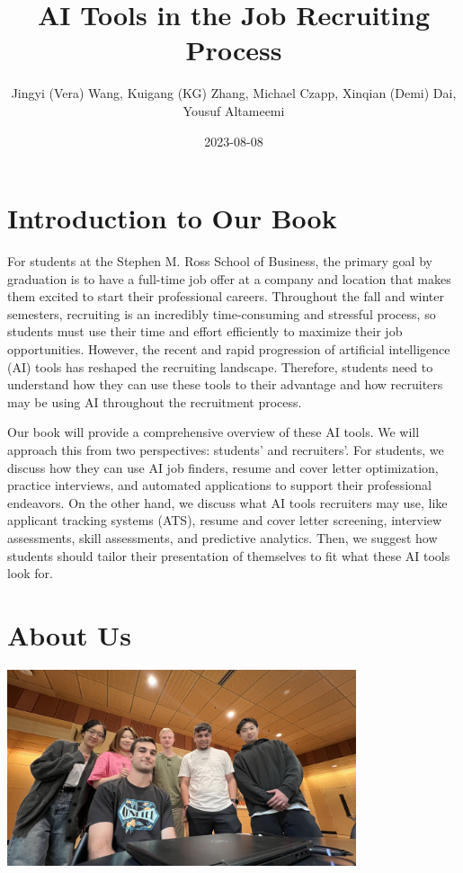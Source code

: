 \documentclass[
]{book}
\title{AI Tools in the Job Recruiting Process}
\author{Jingyi (Vera) Wang, Kuigang (KG) Zhang, Michael Czapp, Xinqian (Demi) Dai, Yousuf Altameemi}
\date{2023-08-08}
\begin{document}
\maketitle

{
\setcounter{tocdepth}{1}
\tableofcontents
}
\hypertarget{introduction-to-our-book}{%
\chapter{Introduction to Our Book}\label{introduction-to-our-book}}

For students at the Stephen M. Ross School of Business, the primary goal by graduation is to have a full-time job offer at a company and location that makes them excited to start their professional careers. Throughout the fall and winter semesters, recruiting is an incredibly time-consuming and stressful process, so students must use their time and effort efficiently to maximize their job opportunities. However, the recent and rapid progression of artificial intelligence (AI) tools has reshaped the recruiting landscape. Therefore, students need to understand how they can use these tools to their advantage and how recruiters may be using AI throughout the recruitment process.

Our book will provide a comprehensive overview of these AI tools. We will approach this from two perspectives: students' and recruiters'. For students, we discuss how they can use AI job finders, resume and cover letter optimization, practice interviews, and automated applications to support their professional endeavors. On the other hand, we discuss what AI tools recruiters may use, like applicant tracking systems (ATS), resume and cover letter screening, interview assessments, skill assessments, and predictive analytics. Then, we suggest how students should tailor their presentation of themselves to fit what these AI tools look for.

\hypertarget{about-us}{%
\chapter{About Us}\label{about-us}}

\includegraphics[width=4.04167in,height=\textheight]{Team Photo.jpg}
\end{document}
